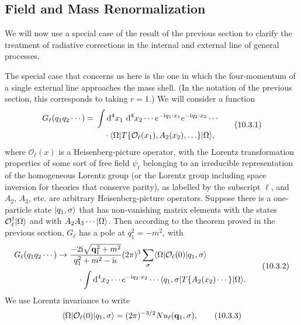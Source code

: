 \subsection{Field and Mass Renormalization}

We will now use a special case of the result of the previous section to
clarify the treatment of radiative corrections in the internal and external
line of general processes.

The special case that concerns us here is the one in which the four-momentum
of a single external line approaches the mass shell. (In the notation of the
previous section, this corresponds to taking $r=1$.) We will consider a
function
\begin{equation}
\begin{split}
G_\ell(q_1q_2\cdots)={}&\int \mathop{}\!\mathrm{d}^4x_1\,\mathop{}\!\mathrm{d}^4x_2\cdots
 e^{-\mathrm{i} q_1\cdot x_1}e^{-\mathrm{i} q_2\cdot x_2}\cdots \\
&\quad\cdot\langle \Omega\rvert T\{\mathcal O_\ell(x_1),A_2(x_2),\ldots\}\lvert \Omega\rangle,
\end{split}
\tag{10.3.1}\label{eq:10.3.1}
\end{equation}
where $\mathcal O_\ell(x)$ is a Heisenberg-picture operator, with the Lorentz
transformation properties of some sort of free field $\psi_\ell$ belonging to
an irreducible representation of the homogeneous Lorentz group (or the Lorentz
group including space inversion for theories that conserve parity), as labelled
by the subscript $\ell$, and $A_2$, $A_3$, etc. are arbitrary
Heisenberg-picture operators. Suppose there is a one-particle state
$\lvert q_1,\sigma\rangle$ that has non-vanishing matrix elements with the states
$\mathcal O_\ell^\dagger\lvert \Omega\rangle$ and with $A_2A_3\cdots\lvert \Omega\rangle$.
Then according to the theorem proved in the previous section, $G_\ell$ has a
pole at $q_1^2=-m^2$, with
\begin{equation}
\begin{split}
G_\ell(q_1q_2\cdots)\to{}&
\frac{-2\mathrm{i}\sqrt{\mathbf q_1^2+m^2}}{q_1^2+m^2-\mathrm{i}\epsilon}
(2\pi)^3\sum_\sigma
\langle \Omega\rvert\mathcal O_\ell(0)\lvert q_1,\sigma\rangle
\\
&\quad\cdot\int \mathop{}\!\mathrm{d}^4x_2\cdots e^{-\mathrm{i} q_2\cdot x_2}\cdots
\langle q_1,\sigma\rvert T\{A_2(x_2)\cdots\}\lvert \Omega\rangle.
\end{split}
\tag{10.3.2}\label{eq:10.3.2}
\end{equation}
We use Lorentz invariance to write
\begin{equation}
\langle \Omega\rvert\mathcal O_\ell(0)\lvert q_1,\sigma\rangle
=(2\pi)^{-3/2}N u_\ell(\mathbf q_1,\sigma),
\tag{10.3.3}\label{eq:10.3.3}
\end{equation}
